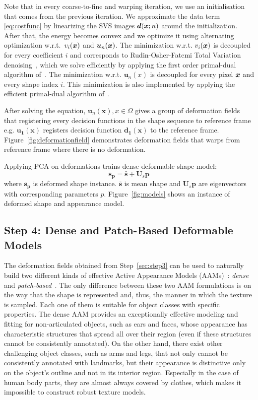 Note that in every coarse-to-fine and warping iteration, we use an initialisation that comes from the previous iteration. We approximate the data term \eqref{eq:costfunc} by linearizing the SVS images $\bm{d}(\bm{x};n)$ around the initialization. After that, the energy becomes convex and we optimize it using alternating optimization w.r.t.~$v_i(\bm{x})$ and $\bm{u}_n(\bm{x})$. The minimization w.r.t. $v_i(\bm{x})$ is decoupled for every coefficient $i$ and corresponds to Rudin-Osher-Fatemi Total Variation denoising~\cite{rudin92}, which we solve efficiently by applying the first order primal-dual algorithm of~\cite{Chambolle:Pock:JMIV2011}. The minimization w.r.t. $\bm{u}_n(x)$ is decoupled for every pixel $\bm{x}$ and every shape index $i$. This minimization is also implemented by applying the efficient primal-dual algorithm of~\cite{Chambolle:Pock:JMIV2011}.

After solving the equation, $\bm{u}_n(\bm{x}), x \in \Omega$ gives a group of deformation fields that registering every decision functions in the shape sequence to reference frame e.g. $\bm{u_1}(\bm{x})$ registers decision function $\bm{d_1}(\bm{x})$ to the reference frame. Figure~\ref{fig:deformationfield} demonstrates deformation fields that warps from reference frame where there is no deformation.

Applying PCA on deformations trains dense deformable shape model:
\begin{equation*}
    \bm{s_p}=\bm{\bar{s}} + \bm{U}_s\bm{p}
\end{equation*}
where $\bm{s_p}$ is deformed shape instance. $\bm{\bar{s}}$ is mean shape and $\bm{U}_s\bm{p}$ are eigenvectors with corresponding parameters $p$. Figure~\ref{fig:models} shows an instance of deformed shape and appearance model.

\subsection*{Step 4: Dense and Patch-Based Deformable Models}
\label{sec:step4}

The deformation fields obtained from Step~\ref{sec:step3} can be used to naturally build two different kinds of effective Active Appearance Models (AAMs)~\cite{Cootes2001, Matthews2004}: \emph{dense}~\cite{ramnath2008increasing, Amberg2009, anderson2014using} and \emph{patch-based}~\cite{Tzimiropoulos2014}. The only difference between these two AAM formulations is on the way that the shape is represented and, thus, the manner in which the texture is sampled. Each one of them is suitable for object classes with specific properties. The dense AAM provides an exceptionally effective modeling and fitting for non-articulated objects, such as ears and faces, whose appearance has characteristic structures that spread all over their region (even if these structures cannot be consistently annotated). On the other hand, there exist other challenging object classes, such as arms and legs, that not only cannot be consistently annotated with landmarks, but their appearance is distinctive only on the object's outline and not in its interior region. Especially in the case of human body parts, they are almost always covered by clothes, which makes it impossible to construct robust texture models.


